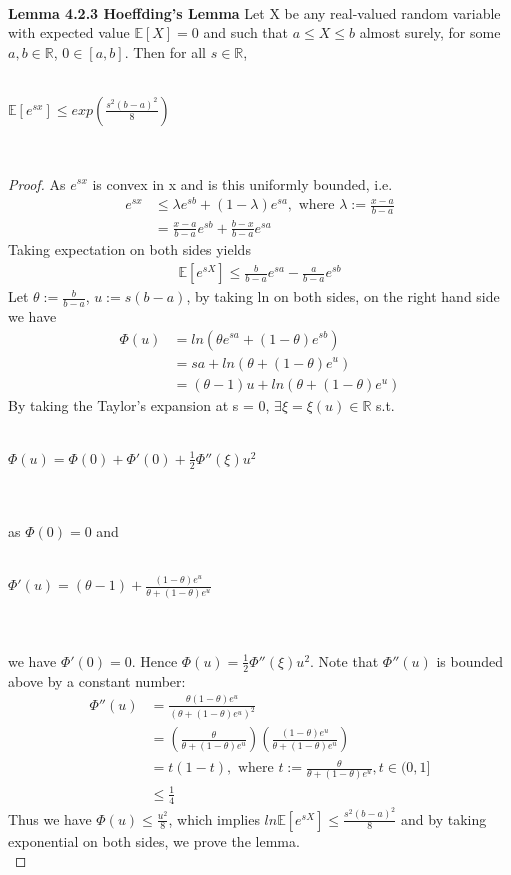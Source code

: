 \documentclass{article}
\begin{document}
\\
\textbf{Lemma 4.2.3 Hoeffding's Lemma} Let X be any real-valued random variable with expected value $\mathbb{E}[X] = 0$ and such that $a \leq X \leq b$ almost surely, for some $a, b \in \mathbb{R}$, $0 \in [a, b]$. Then for all $s \in \mathbb{R}$,\\
\\
\centerline{$\mathbb{E}[e^{sx}] \leq exp\left( \frac{s^2(b-a)^2}{8}\right)$}
\\
\begin{proof}
    As $e^{sx}$ is convex in x and is this uniformly bounded, i.e.
    \begin{align*}
        e^{sx} &\leq \lambda e^{sb} + (1-\lambda) e^{sa}, \text{ where } \lambda := \frac{x-a}{b-a}\\
        &= \frac{x-a}{b-a}e^{sb} + \frac{b-x}{b-a}e^{sa}
    \end{align*}
    Taking expectation on both sides yields
    \begin{align*}
        \mathbb{E}[e^{sX}] \leq \frac{b}{b-a}e^{sa} - \frac{a}{b-a}e^{sb}
    \end{align*}
    Let $\theta := \frac{b}{b-a}$, $u := s(b-a)$, by taking ln on both sides, on the right hand side we have
    \begin{align*}
        \Phi(u) &= ln(\theta e^{sa} + (1-\theta)e^{sb}) \\
        &= sa + ln(\theta + (1-\theta)e^u) \\
        &= (\theta-1)u + ln(\theta +(1 - \theta)e^u) 
    \end{align*}
    By taking the Taylor's expansion at s = 0, $\exists \xi = \xi(u) \in \mathbb{R}$ s.t. \\
    \\
    \centerline{$\Phi(u) = \Phi(0) + \Phi'(0) + \frac{1}{2} \Phi''(\xi)u^2$}
    \\
    \\
    as $\Phi(0) = 0$ and\\
    \\
    \centerline{$\Phi'(u) = (\theta - 1) + \frac{(1-\theta)e^u}{\theta + (1-\theta)e^u}$}
    \\
    \\
    we have $\Phi'(0) = 0$.
    Hence $\Phi(u) = \frac{1}{2} \Phi''(\xi) u^2$.
    Note that $\Phi''(u)$ is bounded above by a constant number:
    \begin{align*}
        \Phi''(u) &= \frac{\theta (1-\theta)e^u}{(\theta + (1-\theta)e^u)^2}\\
        &= \left(\frac{\theta}{\theta + (1-\theta)e^u}\right) \left(\frac{(1-\theta)e^u}{\theta + (1-\theta)e^u}\right) \\
        &= t(1-t), \text{ where }t :=  \frac{\theta}{\theta + (1 - \theta)e^u}, t \in (0, 1] \\
        &\leq \frac{1}{4}
    \end{align*}
    Thus we have $\Phi(u) \leq \frac{u^2}{8}$, which implies $ln \mathbb{E}[e^{sX}] \leq \frac{s^2(b-a)^2}{8}$ and by taking exponential on both sides, we prove the lemma.\\
\end{proof}
\end{document}
